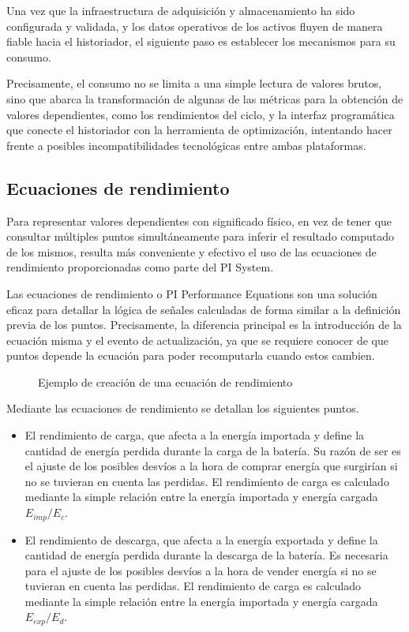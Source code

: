 Una vez que la infraestructura de adquisición y almacenamiento ha sido configurada y validada, y los datos operativos de los activos fluyen de manera fiable hacia el historiador, el siguiente paso es establecer los mecanismos para su consumo.

Precisamente, el consumo no se limita a una simple lectura de valores brutos, sino que abarca la transformación de algunas de las métricas para la obtención de valores dependientes, como los rendimientos del ciclo, y la interfaz programática  que conecte el historiador con la herramienta de optimización, intentando hacer frente a posibles incompatibilidades tecnológicas entre ambas plataformas.

\subsection{Ecuaciones de rendimiento}
\label{makereference3.5.1}

Para representar valores dependientes con significado físico, en vez de tener que consultar múltiples puntos simultáneamente para inferir el resultado computado de los mismos, resulta más conveniente y efectivo el uso de las ecuaciones de rendimiento proporcionadas como parte del PI System.

Las ecuaciones de rendimiento o PI Performance Equations son una solución eficaz para detallar la lógica de señales calculadas de forma similar a la definición previa de los puntos. Precisamente, la diferencia principal es la introducción de la ecuación misma y el evento de actualización, ya que se requiere conocer de que puntos depende la ecuación para poder recomputarla cuando estos cambien.

\begin{figure}
\centering
\caption{Ejemplo de creación de una ecuación de rendimiento}
\label{fig:ecuaciones-de-rendimiento}
\end{figure}

Mediante las ecuaciones de rendimiento se detallan los siguientes puntos.

\begin{itemize}

\item El rendimiento de carga, que afecta a la energía importada y define la cantidad de energía perdida durante la carga de la batería. Su razón de ser es el ajuste de los posibles desvíos a la hora de comprar energía que surgirían si no se tuvieran en cuenta las perdidas. El rendimiento de carga es calculado mediante la simple relación entre la energía importada y energía cargada \(E_{imp} / E_c\).

\item El rendimiento de descarga, que afecta a la energía exportada y define la cantidad de energía perdida durante la descarga de la batería. Es necesaria para el ajuste de los posibles desvíos a la hora de vender energía si no se tuvieran en cuenta las perdidas. El rendimiento de carga es calculado mediante la simple relación entre la energía importada y energía cargada \(E_{exp} / E_d\).

\end{itemize}

